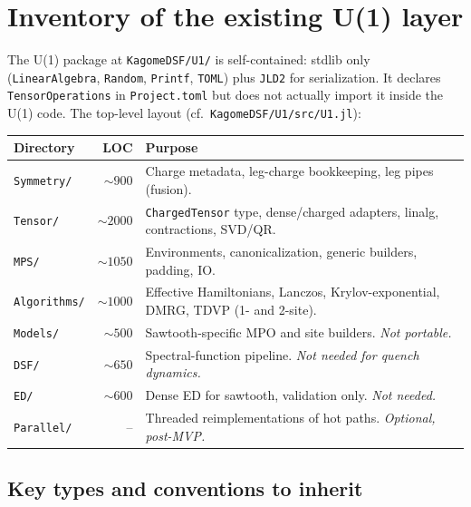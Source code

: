 \documentclass[11pt]{article}
\begin{document}
\section{Inventory of the existing U(1) layer}

The U(1) package at \texttt{KagomeDSF/U1/} is self-contained: stdlib only
(\texttt{LinearAlgebra}, \texttt{Random}, \texttt{Printf}, \texttt{TOML})
plus \texttt{JLD2} for serialization.  It declares \texttt{TensorOperations}
in \texttt{Project.toml} but does not actually import it inside the U(1)
code.  The top-level layout (cf.\ \texttt{KagomeDSF/U1/src/U1.jl}):

\begin{center}
\renewcommand{\arraystretch}{1.05}
\begin{tabularx}{\linewidth}{l r X}
\toprule
Directory & LOC & Purpose \\
\midrule
\texttt{Symmetry/}  & $\sim 900$  & Charge metadata, leg-charge bookkeeping, leg pipes (fusion). \\
\texttt{Tensor/}    & $\sim 2000$ & \texttt{ChargedTensor} type, dense/charged adapters, linalg, contractions, SVD/QR. \\
\texttt{MPS/}       & $\sim 1050$ & Environments, canonicalization, generic builders, padding, IO. \\
\texttt{Algorithms/}& $\sim 1000$ & Effective Hamiltonians, Lanczos, Krylov-exponential, DMRG, TDVP (1- and 2-site). \\
\texttt{Models/}    & $\sim 500$  & Sawtooth-specific MPO and site builders. \emph{Not portable.} \\
\texttt{DSF/}       & $\sim 650$  & Spectral-function pipeline. \emph{Not needed for quench dynamics.} \\
\texttt{ED/}        & $\sim 600$  & Dense ED for sawtooth, validation only. \emph{Not needed.} \\
\texttt{Parallel/}  & --          & Threaded reimplementations of hot paths. \emph{Optional, post-MVP.} \\
\bottomrule
\end{tabularx}
\end{center}

\subsection{Key types and conventions to inherit}
\end{document}

